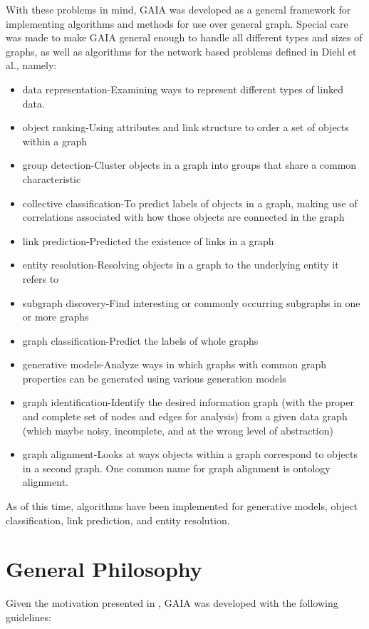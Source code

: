 With these problems in mind, GAIA was developed as a general
framework for implementing algorithms and methods for use
over general graph.  Special care was made to make GAIA
general enough to handle all different types and sizes of graphs,
as well as algorithms for the network based
problems defined in Diehl et al.\cite{getoor:kdd-exp05}, namely:
\begin{itemize}
\item data representation-Examining ways to represent different types of linked data.
\item object ranking-Using attributes and link structure to order a set of objects within a graph
\item group detection-Cluster objects in a graph into groups that share a common characteristic
\item collective classification-To predict labels of objects in a graph, making use
of correlations associated with how those objects are connected in the graph
\item link prediction-Predicted the existence of links in a graph
\item entity resolution-Resolving objects in a graph to the underlying entity it refers to
\item subgraph discovery-Find interesting or commonly occurring subgraphs in one or more graphs
\item graph classification-Predict the labels of whole graphs
\item generative models-Analyze ways in which graphs with common graph properties
can be generated using various generation models
\item graph identification-Identify the desired information graph (with the proper and complete
set of nodes and edges for analysis) from a given data graph (which maybe noisy, incomplete,
and at the wrong level of abstraction)
\item graph alignment-Looks at ways objects within a graph correspond to objects in a second graph.
One common name for graph alignment is ontology alignment.
\end{itemize}

As of this time, algorithms have been implemented for generative models,
object classification, link prediction, and entity resolution.

\section{General Philosophy}
\label{philosophy}
Given the motivation presented in , GAIA was developed with the following
guidelines:

